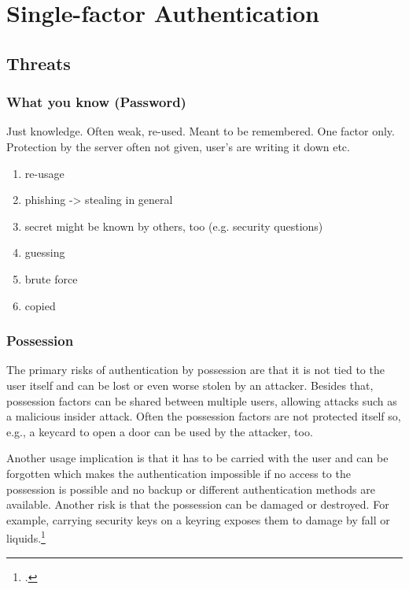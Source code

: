 \chapter{Single-factor Authentication}


\section{Threats}
\label{one-factor-threats}

\subsection{What you know (Password)}

Just knowledge. Often weak, re-used. Meant to be remembered. One factor only.\\
Protection by the server often not given, user's are writing it down etc.

\begin{enumerate}
	\item re-usage
	\item phishing -> stealing in general
	\item secret might be known by others, too (e.g. security questions)
	\item guessing
	\item brute force
	\item copied
\end{enumerate}

\subsection{Possession}

The primary risks of authentication by possession are that it is not tied to the user itself and can be lost or even worse stolen by an attacker. Besides that, possession factors can be shared between multiple users, allowing attacks such as a malicious insider attack. Often the possession factors are not protected itself so, e.g., a keycard to open a door can be used by the attacker, too.

Another usage implication is that it has to be carried with the user and can be forgotten which makes the authentication impossible if no access to the possession is possible and no backup or different authentication methods are available. Another risk is that the possession can be damaged or destroyed. For example, carrying security keys on a keyring exposes them to damage by fall or liquids.\footcites[See][263--264]{shostack2014threat}

